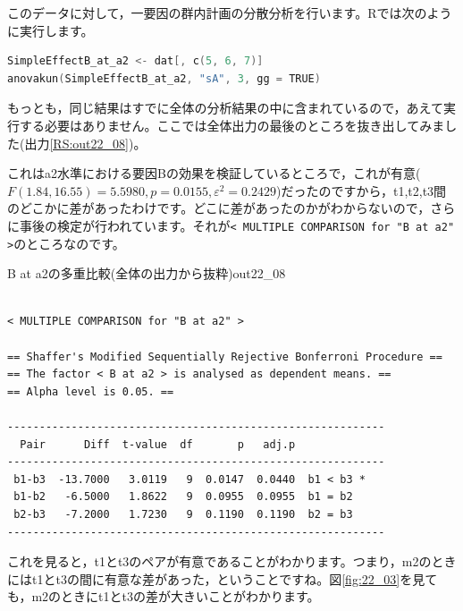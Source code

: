 \documentclass{ltjbook}
\begin{document}
このデータに対して，一要因の群内計画の分散分析を行います。Rでは次のように実行します。

\begin{lstlisting}[language=c++,label={code:22_06},caption={B at a2の単純効果検定}]
SimpleEffectB_at_a2 <- dat[, c(5, 6, 7)]
anovakun(SimpleEffectB_at_a2, "sA", 3, gg = TRUE)
\end{lstlisting}

もっとも，同じ結果はすでに全体の分析結果の中に含まれているので，あえて実行する必要はありません。ここでは全体出力の最後のところを抜き出してみました(出力\ref{RS:out22_08})。

これはa2水準における要因Bの効果を検証しているところで，これが有意($F(1.84,16.55)=5.5980,p=0.0155,\varepsilon^2=0.2429$)だったのですから，t1,t2,t3間のどこかに差があったわけです。どこに差があったのかがわからないので，さらに事後の検定が行われています。それが\verb|< MULTIPLE COMPARISON for "B at a2" >|のところなのです。

\begin{Rscreen}{B at a2の多重比較(全体の出力から抜粋)}{out22_08}
\begin{verbatim}

< MULTIPLE COMPARISON for "B at a2" >

== Shaffer's Modified Sequentially Rejective Bonferroni Procedure ==
== The factor < B at a2 > is analysed as dependent means. == 
== Alpha level is 0.05. == 
 
-----------------------------------------------------------
  Pair      Diff  t-value  df       p   adj.p            
-----------------------------------------------------------
 b1-b3  -13.7000   3.0119   9  0.0147  0.0440  b1 < b3 * 
 b1-b2   -6.5000   1.8622   9  0.0955  0.0955  b1 = b2   
 b2-b3   -7.2000   1.7230   9  0.1190  0.1190  b2 = b3   
-----------------------------------------------------------
\end{verbatim}
\end{Rscreen}

これを見ると，t1とt3のペアが有意であることがわかります。つまり，m2のときにはt1とt3の間に有意な差があった，ということですね。図\ref{fig:22_03}を見ても，m2のときにt1とt3の差が大きいことがわかります。
\end{document}
